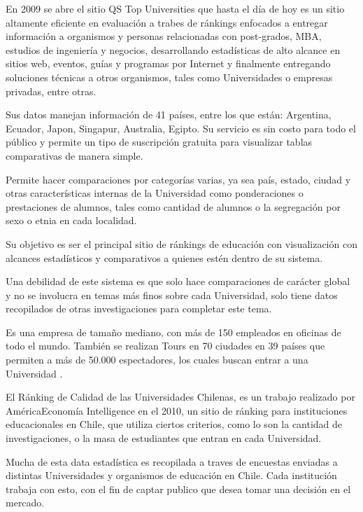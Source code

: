 \documentclass[a4paper,12pt,openany,oneside]{book}
\begin{document}
En 2009 se abre el sitio QS Top Universities que hasta el día de hoy es un sitio altamente eficiente en evaluación a trabes de ránkings enfocados a entregar información a organismos y personas relacionadas con post-grados, MBA, estudios de ingeniería y negocios, desarrollando estadísticas de alto alcance en sitios web, eventos, guías y programas por Internet y finalmente entregando soluciones técnicas a otros organismos, tales como Universidades o empresas privadas, entre otras.

Sus datos manejan información de 41 países, entre los que están: Argentina, Ecuador, Japon, Singapur, Australia, Egipto. Su servicio es sin costo para todo el público y permite un tipo de suscripción gratuita para visualizar tablas comparativas de manera simple.

Permite hacer comparaciones por categorías varias, ya sea país, estado, ciudad y otras características internas de la Universidad como ponderaciones o prestaciones de alumnos, tales como cantidad de alumnos o la segregación por sexo o etnia en cada localidad.

Su objetivo es ser el principal sitio de ránkings de educación con visualización con alcances estadísticos y comparativos a quienes estén dentro de su sistema.

Una debilidad de este sistema es que solo hace comparaciones de carácter global y no se involucra en temas más finos sobre cada Universidad, solo tiene datos recopilados de otras investigaciones para completar este tema.

Es una empresa de tamaño mediano, con más de 150 empleados en oficinas de todo el mundo. También se realizan Tours en 70 ciudades en 39 países que permiten a más de 50.000 espectadores, los cuales buscan entrar a una Universidad  \cite{data2}.

El Ránking de Calidad de las Universidades Chilenas, es un trabajo realizado por AméricaEconomía Intelligence en el 2010, un sitio de ránking para instituciones educacionales en Chile, que utiliza ciertos criterios, como lo son la cantidad de investigaciones, o la masa de estudiantes que entran en cada Universidad.


Mucha de esta data estadística es recopilada a traves de encuestas enviadas a distintas Universidades y organismos de educación en Chile. Cada institución trabaja con esto, con el fin de captar publico que desea tomar una decisión en el mercado.
\end{document}

